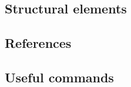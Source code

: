 \graphicspath{{sec01/images/}{sec01/code/}}
\lstset{inputpath=sec01/code/}

\subsection{Structural elements}


\subsection{References}


\subsection{Useful commands}


